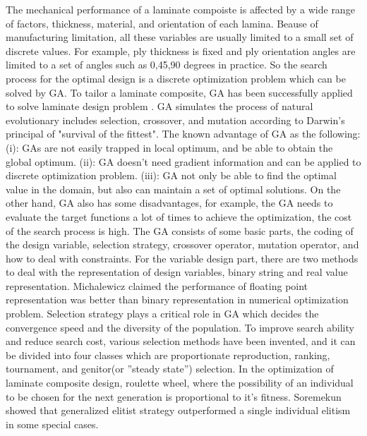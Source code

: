 \documentclass[Afour,sagev,times]{sagej}
\begin{document}
The mechanical performance of a laminate compoiste is affected by a wide range of factors,
thickness, material, and orientation of each lamina. Beause of manufacturing limitation, all these
variables are usually limited to a small set of discrete values. For example, ply thickness is fixed 
and ply orientation angles are limited to a set of angles such as 0,45,90 degrees in practice. So the search process for the
optimal design is a discrete optimization problem which can be solved by GA.
To tailor a laminate composite, GA has been successfully
applied to solve laminate design
problem \cite{riche1993optimization,nagendra1996improved,sadagopan1998application,todoroki1998stacking,liu2000permutation,sivakumar1998optimum,walker2003technique,lin2004stacking,kang2005minimum,murugan2007target,akbulut2008optimum}.
GA simulates the process of natural evolutionary includes selection, crossover, 
and mutation according to Darwin's principal of "survival of the fittest".
The known advantage of GA as the following: (i): GAs are not easily trapped in local
optimum, and be able to obtain the global optimum. (ii): GA doesn't need
gradient information and can be applied to discrete optimization problem.
(iii): GA not only be able to find the optimal value in the domain, but also
can maintain a set of optimal solutions. On the other hand, GA also has some disadvantages, 
for example,  the GA needs to evaluate the target functions a lot of times to achieve the
optimization, the cost of the search process is high. The GA consists of some basic parts, the
coding of the design variable, selection strategy, crossover operator, mutation operator, and how to
deal with  constraints.  For the variable design part,  there are two methods to deal with the
representation of design variables, binary string and real value
representation\cite{riche1993optimization,todoroki1998stacking}.
Michalewicz\cite{zbigniew1996genetic} claimed the performance of floating point representation  was
better than binary representation in numerical optimization problem. Selection strategy plays a
critical role in GA which decides the convergence speed and the diversity of the population.  To
improve search ability and reduce search cost, various selection methods have been invented,
and it can be divided into four classes which are proportionate reproduction,
ranking, tournament, and genitor(or ”steady state”) selection. In the optimization of laminate
composite design, roulette wheel\cite{riche1993optimization,seresta2007optimal}, where the
possibility of an individual to be chosen for the next generation is proportional to it's
fitness.  Soremekun \cite{soremekun2001composite} showed that generalized elitist strategy outperformed a
single individual elitism in some special cases.
\end{document}
